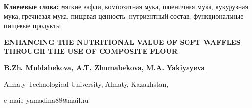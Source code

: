 {\bfseries Ключевые слова:} мягкие вафли, композитная мука, пшеничная мука,
кукурузная мука, гречневая мука, пищевая ценность, нутриентный состав,
функциональные пищевые продукты

\begin{articleheader}
{\bfseries ENHANCING THE NUTRITIONAL VALUE OF SOFT WAFFLES THROUGH THE USE
OF COMPOSITE FLOUR}

{\bfseries
B.Zh. Muldabekova,
A.T. Zhumabekova,
M.A. Yakiyayeva\textsuperscript{\envelope }
}
\end{articleheader}

\begin{affiliation}
Almaty Technological University, Almaty, Kazakhstan,

e-mail: yamadina88@mail.ru
\end{affiliation}

